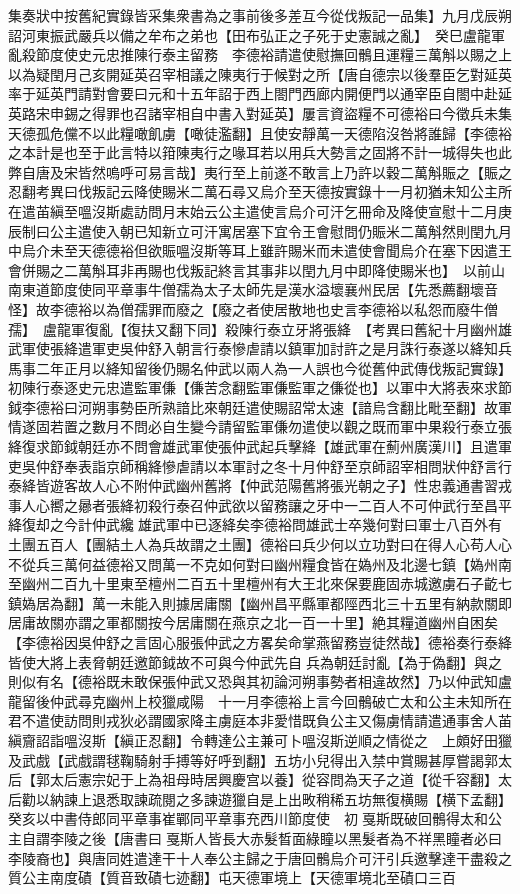 集奏狀中按舊紀實錄皆采集衆書為之事前後多差互今從伐叛記一品集】九月戊辰朔詔河東振武嚴兵以備之牟布之弟也【田布弘正之子死于史憲誠之亂】　癸巳盧龍軍亂殺節度使史元忠推陳行泰主留務　李德裕請遣使慰撫回鶻且運糧三萬斛以賜之上以為疑閏月己亥開延英召宰相議之陳夷行于候對之所【唐自德宗以後羣臣乞對延英率于延英門請對會要曰元和十五年詔于西上閤門西廊内開便門以通宰臣自閤中赴延英路宋申錫之得罪也召諸宰相自中書入對延英】屢言資盜糧不可德裕曰今徵兵未集天德孤危儻不以此糧噉飢虜【噉徒濫翻】且使安靜萬一天德陷沒咎將誰歸【李德裕之本計是也至于此言特以箝陳夷行之喙耳若以用兵大勢言之固將不計一城得失也此弊自唐及宋皆然嗚呼可易言哉】夷行至上前遂不敢言上乃許以穀二萬斛賑之【賑之忍翻考異曰伐叛記云降使賜米二萬石尋又烏介至天德按實錄十一月初猶未知公主所在遣苖縝至嗢沒斯處訪問月末始云公主遣使言烏介可汗乞冊命及降使宣慰十二月庚辰制曰公主遣使入朝已知新立可汗寓居塞下宜令王會慰問仍賑米二萬斛然則閏九月中烏介未至天德德裕但欲賑嗢沒斯等耳上雖許賜米而未遣使會聞烏介在塞下因遣王會併賜之二萬斛耳非再賜也伐叛記終言其事非以閏九月中即降使賜米也】　以前山南東道節度使同平章事牛僧孺為太子太師先是漢水溢壞襄州民居【先悉薦翻壞音怪】故李德裕以為僧孺罪而廢之【廢之者使居散地也史言李德裕以私怨而廢牛僧孺】　盧龍軍復亂【復扶又翻下同】殺陳行泰立牙將張絳　【考異曰舊紀十月幽州雄武軍使張絳遣軍吏吳仲舒入朝言行泰慘虐請以鎮軍加討許之是月誅行泰遂以絳知兵馬事二年正月以絳知留後仍賜名仲武以兩人為一人誤也今從舊仲武傳伐叛記實錄】初陳行泰逐史元忠遣監軍傔【傔苦念翻監軍傔監軍之傔從也】以軍中大將表來求節鉞李德裕曰河朔事勢臣所熟諳比來朝廷遣使賜詔常太速【諳烏含翻比毗至翻】故軍情遂固若置之數月不問必自生變今請留監軍傔勿遣使以觀之既而軍中果殺行泰立張絳復求節鉞朝廷亦不問會雄武軍使張仲武起兵擊絳【雄武軍在薊州廣漢川】且遣軍吏吳仲舒奉表詣京師稱絳慘虐請以本軍討之冬十月仲舒至京師詔宰相問狀仲舒言行泰絳皆遊客故人心不附仲武幽州舊將【仲武范陽舊將張光朝之子】性忠義通書習戎事人心嚮之曏者張絳初殺行泰召仲武欲以留務讓之牙中一二百人不可仲武行至昌平絳復却之今計仲武纔雄武軍中已逐絳矣李德裕問雄武士卒幾何對曰軍士八百外有土團五百人【團結土人為兵故謂之土團】德裕曰兵少何以立功對曰在得人心苟人心不從兵三萬何益德裕又問萬一不克如何對曰幽州糧食皆在媯州及北邊七鎮【媯州南至幽州二百九十里東至檀州二百五十里檀州有大王北來保要鹿固赤城邀虜石子齕七鎮媯居為翻】萬一未能入則據居庸關【幽州昌平縣軍都陘西北三十五里有納款關即居庸故關亦謂之軍都關按今居庸關在燕京之北一百一十里】絶其糧道幽州自困矣【李德裕因吳仲舒之言固心服張仲武之方畧矣命掌燕留務豈徒然哉】德裕奏行泰絳皆使大將上表脅朝廷邀節鉞故不可與今仲武先自兵為朝廷討亂【為于偽翻】與之則似有名【德裕既未敢保張仲武又恐與其初論河朔事勢者相違故然】乃以仲武知盧龍留後仲武尋克幽州上校獵咸陽　十一月李德裕上言今回鶻破亡太和公主未知所在君不遣使訪問則戎狄必謂國家降主虜庭本非愛惜既負公主又傷虜情請遣通事舍人苖縝齎詔詣嗢沒斯【縝正忍翻】令轉達公主兼可卜嗢沒斯逆順之情從之　上頗好田獵及武戲【武戲謂毬鞠騎射手搏等好呼到翻】五坊小兒得出入禁中賞賜甚厚嘗謁郭太后【郭太后憲宗妃于上為祖母時居興慶宫以養】從容問為天子之道【從千容翻】太后勸以納諫上退悉取諫疏閱之多諫遊獵自是上出畋稍稀五坊無復横賜【横下孟翻】　癸亥以中書侍郎同平章事崔鄲同平章事充西川節度使　初戛斯既破回鶻得太和公主自謂李陵之後【唐書曰戛斯人皆長大赤髮晳面綠瞳以黑髮者為不祥黑瞳者必曰李陵裔也】與唐同姓遣達干十人奉公主歸之于唐回鶻烏介可汗引兵邀擊達干盡殺之質公主南度磧【質音致磧七迹翻】屯天德軍境上【天德軍境北至磧口三百